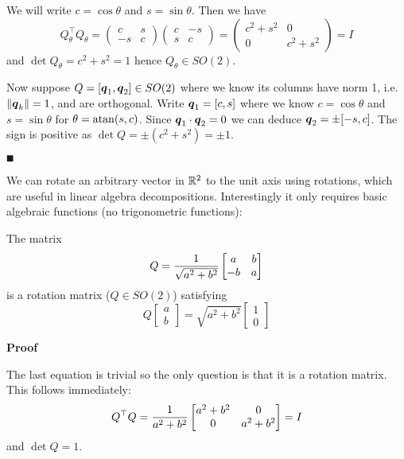 We will write $c = \cos \ensuremath{\theta}$ and $s = \sin \ensuremath{\theta}$. Then we have
\[
Q_\ensuremath{\theta}^\ensuremath{\top}Q_\ensuremath{\theta} = \begin{pmatrix} c & s \\ -s & c \end{pmatrix} \begin{pmatrix} c & -s \\ s & c \end{pmatrix} = 
\begin{pmatrix} c^2 + s^2 & 0 \\ 0 & c^2 + s^2 \end{pmatrix} = I
\]
and $\det Q_\ensuremath{\theta} = c^2 + s^2 = 1$ hence $Q_\ensuremath{\theta} \ensuremath{\in} SO(2)$. 

Now suppose $Q = [\bm{{\mbox{\boldmath$q$\unboldmath}}}_1, \bm{{\mbox{\boldmath$q$\unboldmath}}}_2] \in SO(2)$ where we know its columns have norm 1, i.e. $\|\bm{{\mbox{\boldmath$q$\unboldmath}}}_k\| = 1$, and are orthogonal. Write $\bm{{\mbox{\boldmath$q$\unboldmath}}}_1 = [c,s]$ where we know $c = \cos \ensuremath{\theta}$ and $s = \sin \ensuremath{\theta}$ for $\ensuremath{\theta} = {\rm atan}(s, c)$.  Since $\bm{{\mbox{\boldmath$q$\unboldmath}}}_1\cdot \bm{{\mbox{\boldmath$q$\unboldmath}}}_2 = 0$ we can deduce $\bm{{\mbox{\boldmath$q$\unboldmath}}}_2 = \pm [-s,c]$. The sign is positive as $\det Q = \ensuremath{\pm}(c^2 + s^2) = \ensuremath{\pm}1$.

\ensuremath{\QED}

We can rotate an arbitrary vector in ${\mathbb R}^2$ to the unit axis using rotations, which are useful in linear algebra decompositions. Interestingly it only requires basic algebraic functions (no trigonometric functions):

\begin{proposition}  The matrix
\[
Q = {1 \over \sqrt{a^2 + b^2}}
\begin{bmatrix}
 a & b \cr -b & a
\end{bmatrix}
\]
is a rotation matrix ($Q \ensuremath{\in} SO(2)$) satisfying
\[
Q \begin{bmatrix} a \\ b \end{bmatrix} = \sqrt{a^2 + b^2} \begin{bmatrix} 1 \\ 0 \end{bmatrix}
\]
\end{proposition}
\textbf{Proof} 

The last equation is trivial so the only question is that it is a rotation matrix. This follows immediately:
\[
Q^\ensuremath{\top} Q = {1 \over a^2 + b^2}  \begin{bmatrix}
 a^2 + b^2 & 0 \cr 0 & a^2 + b^2
\end{bmatrix} = I
\]
and $\det Q = 1$.

